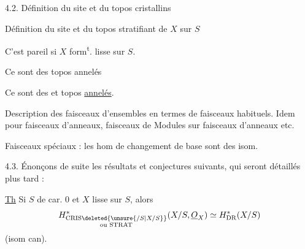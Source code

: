 4.2. Définition du site et du topos cristallins 

Définition du site et du topos stratifiant de $X$ sur $S$

C'est pareil si $X$ form\textsuperscript{t}. lisse sur $S$.

Ce sont des topos annelés

 

Ce sont des  et topos \uline{annelés}.

Description des  faisceaux d'ensembles en termes de faisceaux habituels. Idem pour faisceaux d'anneaux, faisceaux de Modules sur faisceaux d'anneaux etc.

Faisceaux spéciaux : les hom de changement de base sont des isom.


4.3. Énonçons de suite les résultats et conjectures suivants, qui seront  détaillés plus tard :

\uline{Th} Si $S$ de car. $0$ et $X$ lisse sur $S$, alors
\[
H^*_{\substack{\mathrm{CRIS}\deleted{\unsure{/S|X/S}}\\\text{ou }\mathrm{STRAT}}}(X/S,\underline O_X)\simeq H^*_{\mathrm{DR}}(X/S)
\]
(isom can). 

